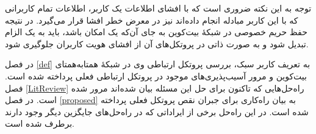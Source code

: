 توجه به این نکته ضروری است که با افشای اطلاعات یک کاربر، اطلاعات تمام کاربرانی که با این کاربر مبادله انجام داده‌اند نیز در معرض خطر افشا قرار می‌گیرد. در نتیجه حفظ حریم خصوصی در شبکه‌ٔ بیت‌کوین به جای آن‌که یک امکان باشد،‌ باید به یک الزام تبدیل شود و به صورت ذاتی در پروتکل‌های آن از افشای هویت کاربران جلوگیری شود.

در فصل \ref{def} به تعریف کاربر سبک، بررسی پروتکل ارتباطی وی در شبکهٔ همتا‌به‌همتای بیت‌کوین و مرور آسیب‌پذیری‌های موجود در پروتکل ارتباطی فعلی پرداخته شده است. فصل \ref{LitReview} راه‌حل‌هایی که تاکنون برای حل این مسئله بیان شده‌اند مرور شده است. در فصل \ref{proposed} به بیان راه‌کاری برای جبران نقص پروتکل فعلی پرداخته شده است. در این راه‌حل برخی از ایراداتی که در راه‌حل‌های جایگزین دیگر وجود دارند برطرف شده است.


 


